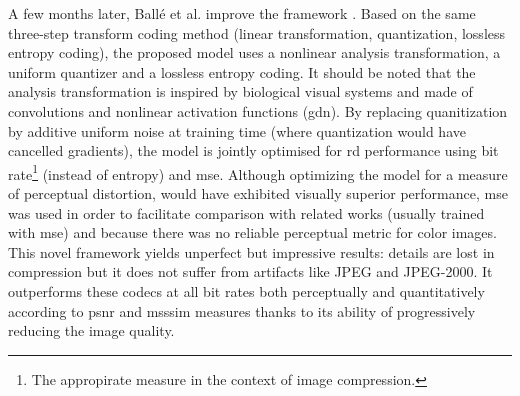 A few months later, Ballé et al. improve the framework \cite{ballé2017endtoendoptimizedimagecompression}. Based on the same three-step transform coding method (linear transformation, quantization, lossless entropy coding), the proposed model uses a nonlinear analysis transformation, a uniform quantizer and a lossless entropy coding. It should be noted that the analysis transformation is inspired by biological visual systems and made of convolutions and nonlinear activation functions (\acrshort{gdn}). By replacing quanitization by additive uniform noise at training time (where quantization would have cancelled gradients), the model is jointly optimised for \acrshort{rd} performance using bit rate\footnote{The appropirate measure in the context of image compression.} (instead of entropy) and \acrshort{mse}. Although optimizing the model for a measure of perceptual distortion, would have exhibited visually superior performance, \acrshort{mse} was used in order to facilitate comparison with related works (usually trained with \acrshort{mse}) and because there was no reliable perceptual metric for color images. This novel framework yields unperfect but impressive results: details are lost in compression but it does not suffer from artifacts like JPEG and JPEG-2000. It outperforms these codecs at all bit rates both perceptually and quantitatively according to \acrshort{psnr} and \acrshort{msssim} measures thanks to its ability of progressively reducing the image quality.

